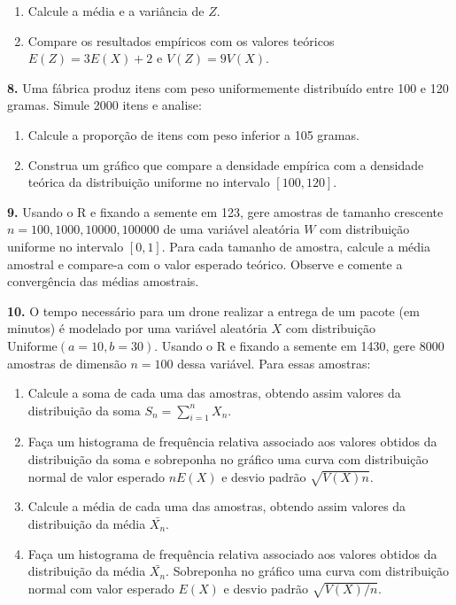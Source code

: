 \documentclass[
]{book}
\begin{document}
\begin{enumerate}
\def\labelenumi{(\alph{enumi})}
\item
  Calcule a média e a variância de \(Z\).
\item
  Compare os resultados empíricos com os valores teóricos \(E(Z) = 3E(X) + 2\) e \(V(Z) = 9V(X)\).
\end{enumerate}

\textbf{8.} Uma fábrica produz itens com peso uniformemente distribuído entre 100 e 120 gramas. Simule 2000 itens e analise:

\begin{enumerate}
\def\labelenumi{(\alph{enumi})}
\item
  Calcule a proporção de itens com peso inferior a 105 gramas.
\item
  Construa um gráfico que compare a densidade empírica com a densidade teórica da distribuição uniforme no intervalo \([100, 120]\).
\end{enumerate}

\textbf{9.} Usando o R e fixando a semente em 123, gere amostras de tamanho
crescente \(n = 100, 1000, 10000, 100000\) de uma variável aleatória \(W\) com
distribuição uniforme no intervalo \([0, 1]\). Para cada tamanho de
amostra, calcule a média amostral e compare-a com o valor esperado
teórico. Observe e comente a convergência das médias amostrais.

\textbf{10.} O tempo necessário para um drone realizar a entrega de um pacote (em minutos) é modelado por uma variável aleatória \(X\) com distribuição \(\text{Uniforme}(a=10, b=30)\). Usando o R e fixando a semente em 1430, gere 8000 amostras de dimensão \(n=100\) dessa variável. Para essas amostras:

\begin{enumerate}
\def\labelenumi{(\alph{enumi})}
\item
  Calcule a soma de cada uma das amostras, obtendo assim valores da distribuição da soma \(S_{n} = \sum_{i=1}^{n}X_{n}\).
\item
  Faça um histograma de frequência relativa associado aos valores obtidos da distribuição da soma e sobreponha no gráfico uma curva com distribuição normal de valor esperado \(nE(X)\) e desvio padrão \(\sqrt{V(X)n}\).
\item
  Calcule a média de cada uma das amostras, obtendo assim valores da distribuição da média \(\bar{X_{n}}\).
\item
  Faça um histograma de frequência relativa associado aos valores obtidos da distribuição da média \(\bar{X_{n}}\). Sobreponha no gráfico uma curva com distribuição normal com valor esperado \(E(X)\) e desvio padrão \(\sqrt{V(X)/n}\).
\end{enumerate}
\end{document}
